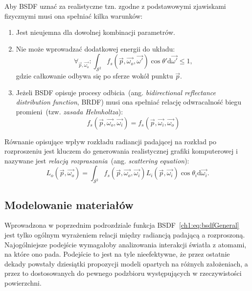 \begin{itemize}
Aby BSDF uznać za realistyczne tzn. zgodne z podstawowymi zjawiskami fizycznymi musi ona spełniać kilka warunków:
\begin{enumerate}
\item Jest nieujemna dla dowolnej kombinacji parametrów.
\item Nie może wprowadzać dodatkowej energii do układu:
\begin{equation}
\forall_{\vec{p}, \vec{\omega_o}}: \int_{\mathcal{S}^2}f_s(\vec{p}, \vec{\omega_o}, \vec{\omega'})\cos\theta'\mathrm{d}\vec{\omega'} \leq 1,
\end{equation}
gdzie całkowanie odbywa się po sferze wokół punktu $\vec{p}$.
\item Jeżeli BSDF opisuje procesy odbicia~(ang. \textit{bidirectional reflectance distribution function}, BRDF) musi ona spełniać relację odwracalność biegu promieni~(tzw. \textit{zasada Helmholtza}):
\begin{equation}
f_s(\vec{p}, \vec{\omega_o}, \vec{\omega_i}) = f_s(\vec{p}, \vec{\omega_i}, \vec{\omega_o})
\end{equation}
\end{enumerate}
Równanie opisujące wpływ rozkładu radiancji padającej na rozkład po rozproszeniu jest kluczem do generowania realistycznej grafiki komputerowej i nazywane jest \textit{relacją rozpraszania}~(ang. \textit{scattering equation}):
\begin{equation}
L_o(\vec{p}, \vec{\omega_o}) = \int_{\mathcal{S}^2}f_s(\vec{p}, \vec{\omega_o}, \vec{\omega_i})L_i(\vec{p}, \vec{\omega_i})\cos\theta_i\mathrm{d}\vec{\omega_i}.
\label{ch1:eq:ScatteringEquation}
\end{equation}
\end{itemize}

\subsection{Modelowanie materiałów}
Wprowadzona w poprzednim podrozdziale funkcja BSDF~\eqref{ch1:eq:bsdfGeneral} jest tylko ogólnym wyrażeniem relacji między radiancją padającą a rozproszoną. Najogólniejsze podejście wymagałoby analizowania interakcji światła z atomami, na które ono pada. Podejście to jest na tyle nieefektywne, że przez ostatnie dekady powstały dziesiątki propozycji modeli opartych na różnych założeniach, a przez to dostosowanych do pewnego podzbioru występujących w rzeczywistości powierzchni. 


